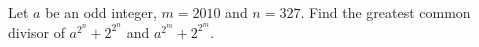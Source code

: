 Let $a$ be an odd integer, $m=2010$ and $n=327$. Find the greatest common divisor of $a^{2^n}+2^{2^n}$ and $a^{2^m}+2^{2^m}$.
